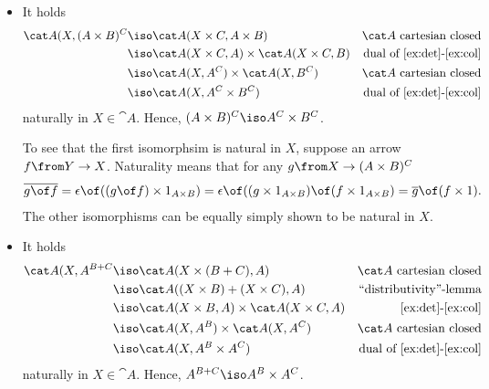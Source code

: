 \begin{answer}
  \begin{itemize}
  \item It holds
    \begin{align*}
      \cat A(X,(A\times B)^C&\iso\cat A(X\times C,A\times B)&\cat A\text{ cartesian closed}\\
                            &\iso\cat A(X\times C,A)\times \cat A(X\times C,B)&\text{dual of \ref{ex:det}-\ref{ex:col}}\\
                            &\iso\cat A(X,A^C)\times \cat A(X,B^C)&\cat A\text{ cartesian closed}\\
                            &\iso\cat A(X,A^C\times B^C)&\text{dual of \ref{ex:det}-\ref{ex:col}}
    \end{align*}
    naturally in $X\in\cat A$. Hence, $(A\times B)^C\iso A^C\times B^C$.

    To see that the first isomorphsim is natural in $X$, suppose an arrow $f\from Y\to X$. Naturality means that for any $g\from X\to (A\times B)^C$
    \begin{align*}
      \overline{g\of f}=\epsilon\of ((g\of f)\times 1_{A\times B})=\epsilon\of ((g\times 1_{A\times B})\of(f\times 1_{A\times B})=\overline g\of (f\times 1).
    \end{align*}
    The other isomorphisms can be equally simply shown to be natural in $X$.
  \item It holds
    \begin{align*}
      \cat A(X,A^{B+C}&\iso\cat A(X\times (B+C),A)&\cat A\text{ cartesian closed}\\
                      &\iso\cat A((X\times B)+(X\times C),A)&\text{``distributivity''-lemma}\\
                      &\iso\cat A(X\times B,A)\times\cat A(X\times C, A)&\text{\ref{ex:det}-\ref{ex:col}}\\
                      &\iso\cat A(X,A^B)\times\cat A(X, A^C)&\cat A\text{ cartesian closed}\\
                      &\iso\cat A(X,A^B\times A^C)&\text{dual of \ref{ex:det}-\ref{ex:col}}
    \end{align*}
    naturally in $X\in\cat A$. Hence, $A^{B+C}\iso A^B\times A^C$.
  \end{itemize}
\end{answer}

